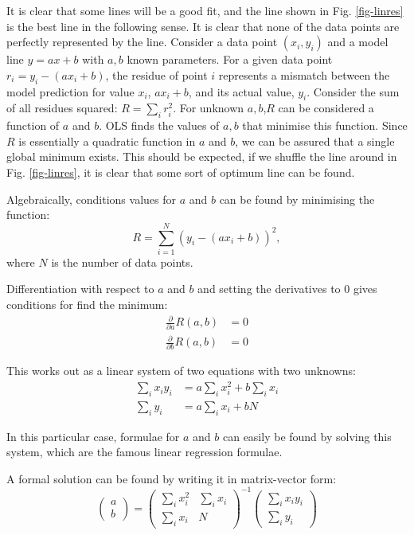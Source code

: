    It is clear that some lines will be a good fit, and the line shown in Fig. \ref{fig-linres} is the best line in the following sense. It is clear  that none
   of the data points are perfectly represented by the line. Consider a data point $(x_i, y_i)$ and a model line $y = ax + b$ with $a, b$ known parameters.
   For a given data point $r_i = y_i -(ax_i + b)$, the residue of point $i$ represents a mismatch between the model prediction for value $x_i$, $ax_i + b$, and its actual
   value, $y_i$. Consider the sum of all residues squared: $R = \sum_i r^2_i$. For unknown $a, b$,$R$ can be considered a function of $a$ and $b$. OLS finds the values
   of $a, b$ that minimise this function. Since $R$ is essentially a quadratic function in $a$ and $b$, we can be assured that a single global minimum exists. This
   should be expected, if we shuffle the line around in Fig. \ref{fig-linres}, it is clear that some sort of optimum line can be found.

   
   Algebraically, conditions values for $a$ and $b$ can be found by minimising the function:
   $$
   R = \sum^N_{i=1} (y_i -(ax_i + b))^2,
   $$
   where $N$ is the number of data points.
   
   Differentiation with respect to $a$ and $b$ and setting the derivatives to 0 gives conditions for find the minimum:
   \begin{align}
     \frac{\partial}{\partial a}R(a, b) &  = 0 \nonumber \\
     \frac{\partial}{\partial b}R(a,b)  &  = 0 \nonumber
   \end{align}


   This works out as a linear system of two equations with two unknowns:
   \begin{align}
     \sum_i x_iy_i & = a \sum_i x^2_i + b \sum_i x_i \nonumber \\
     \sum_i y_i    & = a \sum_i x_i   + bN
   \end{align}

   
   
   In this particular case, formulae for $a$ and $b$ can easily be found by solving this system, which are the famous linear regression formulae.

   A formal solution can be found by writing it in matrix-vector form:
   \begin{equation}
     \left( \begin{array}{c} a \\ b \end{array} \right) = \left( \begin{array}{cc} \sum_i  x^2_i &  \sum_i x_i \\ \sum_i x_i & N \end{array} \right)^{-1}
     \left( \begin{array}{c} \sum_i x_iy_i \\ \sum_i y_i \end{array} \right)
   \end{equation}

